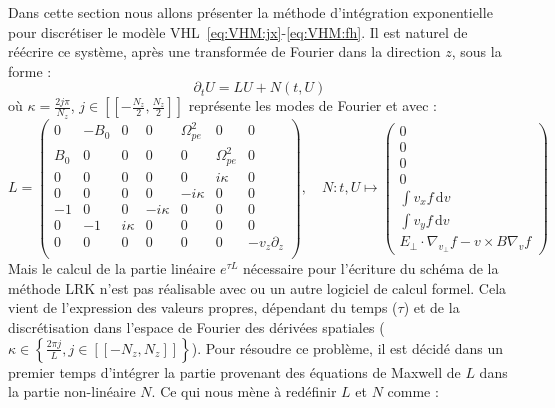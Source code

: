 Dans cette section nous allons présenter la méthode d'intégration exponentielle pour discrétiser le modèle VHL~\eqref{eq:VHM:jx}-\eqref{eq:VHM:fh}. Il est naturel de réécrire ce système, après une transformée de Fourier dans la direction $z$, sous la forme :
$$
  \partial_t U = LU + N(t,U)
$$
où $\kappa=\frac{2j\pi}{N_z}$, $j\in[\![-\frac{N_z}{2},\frac{N_z}{2}]\!]$ représente les modes de Fourier et avec :
\begin{equation}
  L = \begin{pmatrix}
    0   & -B_0 & 0          &  0          &  \Omega_{pe}^2 & 0             & 0 \\
    B_0 &  0   & 0          &  0          &  0             & \Omega_{pe}^2 & 0 \\
    0   &  0   & 0          &  0          &  0             & i\kappa       & 0 \\
    0   &  0   & 0          &  0          & -i\kappa       & 0             & 0 \\
   -1   &  0   & 0          & -i\kappa    &  0             & 0             & 0 \\
    0   & -1   & i\kappa    &  0          &  0             & 0             & 0 \\
    0   &  0   & 0          &  0          &  0             & 0             & -v_z\partial_z \\
  \end{pmatrix},
  \quad
  N:t,U\mapsto \begin{pmatrix}
    0 \\
    0 \\
    0 \\
    0 \\
    \int v_x f \,\mathrm{d}v \\
    \int v_y f \,\mathrm{d}v \\
    E_{\perp}\cdot\nabla_{v_\perp} f - v\times B\nabla_v f
  \end{pmatrix}
  \label{eq:3:LNmaxwell}
\end{equation}
Mais le calcul de la partie linéaire $e^{\tau L}$ nécessaire pour l'écriture du schéma de la méthode LRK n'est pas réalisable avec \sympy{} ou un autre logiciel de calcul formel. Cela vient de l'expression des valeurs propres, dépendant du temps ($\tau$) et de la discrétisation dans l'espace de Fourier des dérivées spatiales ($\kappa\in\left\{\frac{2\pi j}{L},j\in[\![-N_z,N_z]\!]\right\}$). Pour résoudre ce problème, il est décidé dans un premier temps d'intégrer la partie provenant des équations de Maxwell de $L$ dans la partie non-linéaire $N$. Ce qui nous mène à redéfinir $L$ et $N$ comme :
